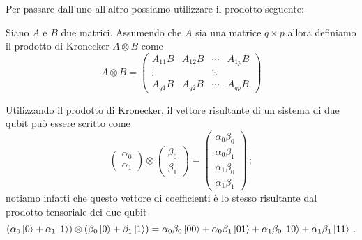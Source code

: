 \noindent Per passare dall'uno all'altro possiamo utilizzare il prodotto seguente:

\begin{definizione}\label{def:Kronecker}
    Siano $A$ e $B$ due matrici. Assumendo che $A$ sia una matrice $q \times p$ allora definiamo il prodotto di Kronecker $A \otimes B$ come
    \begin{equation*}
        A \otimes B =
        \begin{pmatrix}
            A_{11} B & A_{12} B & \cdots & A_{1p} B \\ 
            \vdots & & \ddots & \\
            A_{q1} B & A_{q2} B & \cdots & A_{qp} B
        \end{pmatrix}
    \end{equation*}
\end{definizione}

\begin{esempio}
    Utilizzando il prodotto di Kronecker, il vettore risultante di un sistema di due qubit può essere scritto come
    \begin{equation*}
        \begin{pmatrix}
            \alpha_0 \\ \alpha_1
        \end{pmatrix}
        \otimes
        \begin{pmatrix}
            \beta_0 \\ \beta_1
        \end{pmatrix}
        =
        \begin{pmatrix}
            \alpha_0 \beta_0 \\ \alpha_0 \beta_1 \\ \alpha_1 \beta_0 \\ \alpha_1 \beta_1
        \end{pmatrix} \, ;
    \end{equation*}
    notiamo infatti che questo vettore di coefficienti è lo stesso risultante dal prodotto tensoriale dei due qubit
    \begin{equation*}
        (\alpha_0 \ket{0} + \alpha_1 \ket{1}) \otimes (\beta_0 \ket{0} + \beta_1 \ket{1}) = \alpha_0 \beta_0 \ket{00} + \alpha_0 \beta_1 \ket{01} + \alpha_1 \beta_0 \ket{10} + \alpha_1 \beta_1 \ket{11} \, .
    \end{equation*}
\end{esempio}


